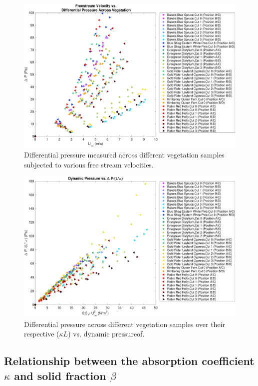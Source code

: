 \documentclass[12pt]{article}
\begin{document}
\begin{figure} [h]
	\includegraphics[width=\linewidth]{DPvU(Overall_Ave).pdf}
	\caption{Differential pressure measured across different vegetation samples subjected to various free stream velocities.}
	\label{fig:DPvU(Overall)}
\end{figure}

\begin{figure}[h]
	\includegraphics[width=\linewidth]{DPoveraf(Overall_Ave).pdf}
	\caption{Differential pressure across different vegetation samples over their respective ($\kappa L$) vs. dynamic pressureof.}
	\label{fig:DPoveraf(Overall)}
\end{figure}

\subsection{Relationship between the absorption coefficient $\kappa$ and solid fraction $\beta$ }
\end{document}
